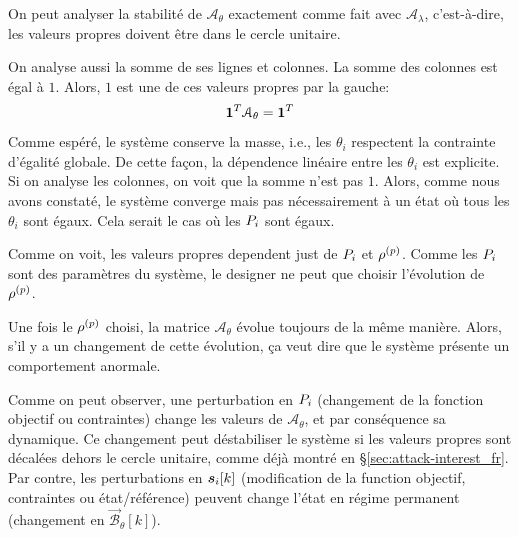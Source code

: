 \documentclass[../main.tex]{subfiles}
\begin{document}
On peut analyser la stabilité de $\mathcal{A}_{\theta}$ exactement comme fait avec $\mathcal{A}_{\lambda}$, c'est-à-dire, les valeurs propres doivent être dans le cercle unitaire.

On analyse aussi la somme de ses lignes et colonnes.
La somme des colonnes est égal à $1$.
Alors, $1$ est une de ces valeurs propres par la gauche:
\begin{equation}
  \label{eq:1}
  \mathbf{1}^{T}\mathcal{A}_{\theta}=\mathbf{1}^{T}
\end{equation}
Comme espéré, le système conserve la masse, i.e., les $\theta_{i}$ respectent la contrainte d'égalité globale.
De cette façon, la dépendence linéaire entre les $\theta_{i}$ est explicite.
Si on analyse les colonnes, on voit que la somme n'est pas $1$.
Alors, comme nous avons constaté, le système converge mais pas nécessairement à un état où tous les $\theta_{i}$ sont égaux.
Cela serait le cas où les ${P}_{i}$ sont égaux.

Comme on voit, les valeurs propres dependent just de ${P}_{i}$ et $\rho^{(p)}$.
Comme les ${P}_{i}$ sont des paramètres du système, le designer ne peut que choisir l'évolution de $\rho^{(p)}$.

Une fois le $\rho^{(p)}$ choisi, la matrice $\mathcal{A}_{\theta}$ évolue toujours de la même manière.
Alors, s'il y a un changement de cette évolution, ça veut dire que le système présente un comportement anormale.

Comme on peut observer, une perturbation en ${P}_{i}$ (changement de la fonction objectif ou contraintes) change les valeurs de $\mathcal{A}_{\theta}$, et par conséquence sa dynamique.
Ce changement peut déstabiliser le système si les valeurs propres sont décalées dehors le cercle unitaire, comme déjà montré en \S\ref{sec:attack-interest_fr}.
Par contre, les perturbations en $\boldsymbol{s}_{i}[k]$ (modification de la function objectif, contraintes ou état/référence) peuvent change l'état en régime permanent (changement en $\mathcal{\vec{B}}_{\theta}[k]$).
\end{document}
